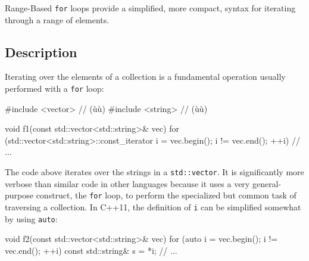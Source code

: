 


\label{range-based-for-loops}
\setcounter{table}{0}
\setcounter{footnote}{0}
\setcounter{lstlisting}{0}

Range-Based \lstinline!for! loops provide a simplified, more compact,
syntax for iterating through a range of elements.

\subsection[Description]{Description}\label{description-rangefor}

Iterating over the elements of a collection is a fundamental operation
usually performed with a \lstinline!for! loop:

\begin{emcppslisting}
#include <vector>  // (ù{}ù)
#include <string>  // (ù{}ù)

void f1(const std::vector<std::string>& vec)
{
    for (std::vector<std::string>::const_iterator i = vec.begin();
         i != vec.end(); ++i)
    {
        // ...
    }
}
\end{emcppslisting}
    

\noindent The code above iterates over the strings in a \lstinline!std::vector!. It
is significantly more verbose than similar code in other languages
because it uses a very general-purpose construct, the \lstinline!for! loop,
to perform the specialized but common task of traversing a collection.
In C++11, the definition of \lstinline!i! can be simplified somewhat by
using \lstinline!auto!:

\begin{emcppslisting}
void f2(const std::vector<std::string>& vec)
{
    for (auto i = vec.begin(); i != vec.end(); ++i)
    {
        const std::string& s = *i;
        // ...
    }
}
\end{emcppslisting}
    

